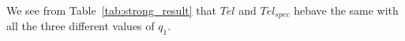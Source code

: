 \documentclass[runningheads]{llncs}
\begin{document}
We see from  Table~\ref{tab:strong_result} that $Tel$ and $Tel_{spec}$ hebave the same with all the three different values of $q_1$.
\end{document}
